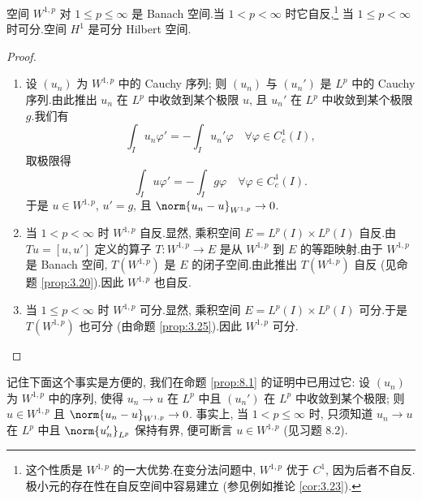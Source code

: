 \begin{proposition}
\label{prop:8.1}
空间 $W^{1,p}$ 对 $1\le p\le\infty$ 是 Banach 空间.当 $1<p<\infty$ 时它自反,\footnote{这个性质是 $W^{1,p}$ 的一大优势.在变分法问题中, $W^{1,p}$ 优于
$C^1$, 因为后者不自反.极小元的存在性在自反空间中容易建立 (参见例如推论
 \ref{cor:3.23}).} 当 $1\le p<\infty$ 时可分.空间 $H^1$ 是可分 Hilbert 空间.
\end{proposition}

\begin{proof}
\begin{enumerate}[label=(\alph*), leftmargin=2.2em, itemsep=0.3em]
	\item 设 $(u_n)$ 为 $W^{1,p}$ 中的 Cauchy 序列; 则 $(u_n)$ 与 $(u_n')$ 是
	      $L^p$ 中的 Cauchy 序列.由此推出 $u_n$ 在 $L^p$ 中收敛到某个极限 $u$,
	      且 $u_n'$ 在 $L^p$ 中收敛到某个极限 $g$.我们有
	      \begin{equation*}
	      \int_I u_n\varphi'=-\int_I u_n'\varphi
	      \quad\forall\varphi\in C_c^1(I),
	      \end{equation*}
	      取极限得
	      \begin{equation*}
	      \int_I u\varphi'=-\int_I g\varphi
	      \quad\forall\varphi\in C_c^1(I).
	      \end{equation*}
	      于是 $u\in W^{1,p}$, $u'=g$, 且 $\norm{u_n-u}_{W^{1,p}}\to0$.
	\item 当 $1<p<\infty$ 时 $W^{1,p}$ 自反.显然, 乘积空间
	      $E=L^p(I)\times L^p(I)$ 自反.由 $Tu=[u,u']$ 定义的算子
	      $T:W^{1,p}\to E$ 是从 $W^{1,p}$ 到 $E$ 的等距映射.由于 $W^{1,p}$
	      是 Banach 空间, $T(W^{1,p})$ 是 $E$ 的闭子空间.由此推出
	      $T(W^{1,p})$ 自反 (见命题  \ref{prop:3.20}).因此 $W^{1,p}$ 也自反.
	\item 当 $1\le p<\infty$ 时 $W^{1,p}$ 可分.显然, 乘积空间
	      $E=L^p(I)\times L^p(I)$ 可分.于是 $T(W^{1,p})$ 也可分 (由命题
	       \ref{prop:3.25}).因此 $W^{1,p}$ 可分.
\end{enumerate}
\end{proof}

\begin{remark}
\label{rem:8.4}
记住下面这个事实是方便的, 我们在命题  \ref{prop:8.1} 的证明中已用过它: 设
$(u_n)$ 为 $W^{1,p}$ 中的序列, 使得 $u_n\to u$ 在 $L^p$ 中且 $(u_n')$ 在
$L^p$ 中收敛到某个极限; 则 $u\in W^{1,p}$ 且 $\norm{u_n-u}_{W^{1,p}}\to0$.
事实上, 当 $1<p\le\infty$ 时, 只须知道 $u_n\to u$ 在 $L^p$ 中且
$\norm{u_n'}_{L^p}$ 保持有界, 便可断言 $u\in W^{1,p}$ (见习题 8.2).
\end{remark}

